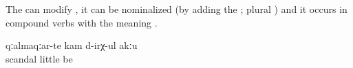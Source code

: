 The    can modify , it can be nominalized (by adding the  ; plural  ) and it occurs in compound verbs with the meaning  .

\begin{exe}
	\ex	\label{ex:The scandals (i.e. fights) did not diminish}
	\gll	qːalmaqːar-te	kam	d-irχ-ul	akːu\\
		scandal	little	be	\\
	\glt	{}
\end{exe}


